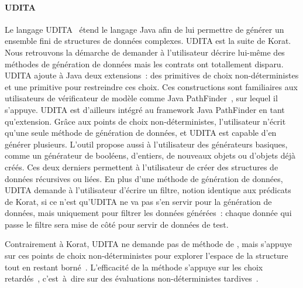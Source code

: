 \paragraph{UDITA} Le langage UDITA~ étend le langage Java
afin de lui permettre de générer un ensemble fini de structures de données
complexes. UDITA est la suite de Korat. Nous retrouvons la démarche de demander
à l'utilisateur décrire lui-même des méthodes de génération de données mais les
contrats ont totallement disparu. UDITA ajoute à Java deux extensions~: des
primitives de choix non-déterministes et une primitive pour restreindre ces
choix. Ces constructions sont familiaires aux utilisateurs de vérificateur de
modèle comme Java PathFinder~, sur lequel il s'appuye. UDITA
est d'ailleurs intégré au framework Java PathFinder en tant qu'extension. Grâce
aux points de choix non-déterministes, l'utilisateur n'écrit qu'une seule
méthode de génération de données, et UDITA est capable d'en générer plusieurs.
L'outil propose aussi à l'utilisateur des générateurs basiques, comme un
générateur de booléens, d'entiers, de nouveaux objets ou d'objets déjà créés.
Ces deux derniers permettent à l'utilisateur de créer des structures de données
récursives ou liées. En plus d'une méthode de génération de données, UDITA
demande à l'utilisateur d'écrire un filtre, notion identique aux prédicats de
Korat, si ce n'est qu'UDITA ne va pas s'en servir pour la génération de données,
mais uniquement pour filtrer les données générées~: chaque donnée qui passe le
filtre sera mise de côté pour servir de données de test.

Contrairement à Korat, UDITA ne demande pas de méthode de
, mais s'appuye sur ces points de choix
non-déterministes pour explorer l'espace de la structure tout en restant
borné~. L'efficacité de la méthode s'appuye
sur les choix retardés~, c'est~à~dire sur des évaluations
non-déterministes tardives~. \\




